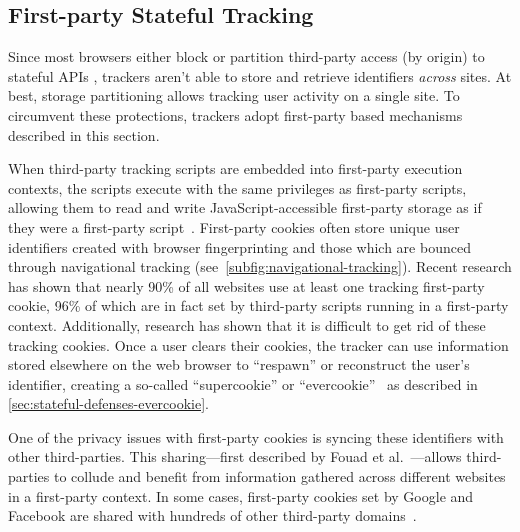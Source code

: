 \subsection{First-party Stateful Tracking}
\label{sec:fp-stateful}


Since most browsers either block \cite{TrackingPreventionWebKit2020} or partition third-party access (by origin) to stateful APIs \cite{mdnThirdpartyCookiesPrivacy2024}, trackers aren’t able to store and retrieve identifiers \textit{across} sites. 
%
At best, storage partitioning allows tracking user activity on a single site.
%
To circumvent these protections, trackers adopt first-party based mechanisms described in this section.


\label{subsubsec:stateful-tracking-cookies}
When third-party tracking scripts are embedded into first-party execution contexts, the scripts execute with the same privileges as first-party scripts, allowing them to read and write JavaScript-accessible first-party storage as if they were a first-party script~\cite{bahramiCOOKIEGUARDCharacterizingIsolating2024}. 
%
First-party cookies often store unique user identifiers created with browser fingerprinting and those which are bounced through navigational tracking (see~\autoref{subfig:navigational-tracking}). 
%
Recent research \cite{munirCookieGraphUnderstandingDetecting2023,vekaria2024WebAlmanac2024} has shown that nearly 90\% of all websites use at least one tracking first-party cookie, 96\% of which are in fact set by third-party scripts running in a first-party context.
% 
Additionally, research has shown that it is difficult to get rid of these tracking cookies.
%
Once a user clears their cookies, the tracker can use information stored elsewhere on the web browser to ``respawn'' or reconstruct the user’s identifier, creating a so-called ``supercookie'' or ``evercookie''~\cite{ayensonFlashCookiesPrivacy2011,soltaniFlashCookiesPrivacy2009,fouadMyCookiePhoenix2022} as described in \autoref{sec:stateful-defenses-evercookie}.

One of the privacy issues with first-party cookies is syncing these identifiers with other third-parties. 
%
This sharing---first described by Fouad et al.~\cite{fouadMissedFilterLists2020}---allows third-parties to collude and benefit from information gathered across different websites in a first-party context. 
%
In some cases, first-party cookies set by Google and Facebook are shared with hundreds of other third-party domains~\cite{munirCookieGraphUnderstandingDetecting2023,bahramiCOOKIEGUARDCharacterizingIsolating2024}.
%


